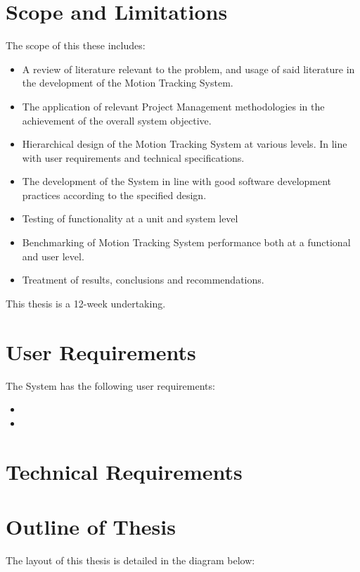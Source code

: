 \section{Scope and Limitations}
The scope of this these includes: 
\begin{itemize}
    \item A review of literature relevant to the problem, and usage of
        said literature in the development of the Motion Tracking System.
    \item The application of relevant Project Management methodologies in the
        achievement of the overall system objective.
    \item Hierarchical design of the Motion Tracking System at various levels.
        In line with user requirements and technical specifications.
    \item The development of the System in line with good software development
        practices according to the specified design.
    \item Testing of functionality at a unit and system level
    \item Benchmarking of Motion Tracking System performance both at a
        functional and user level.
    \item Treatment of results, conclusions and recommendations.
\end{itemize}

This thesis is a 12-week undertaking.

\section{User Requirements}
The System has the following user requirements:
\begin{itemize}
    \item 
    \item
\end{itemize}

\section{Technical Requirements}


\section{Outline of Thesis}
The layout of this thesis is detailed in the diagram below:


